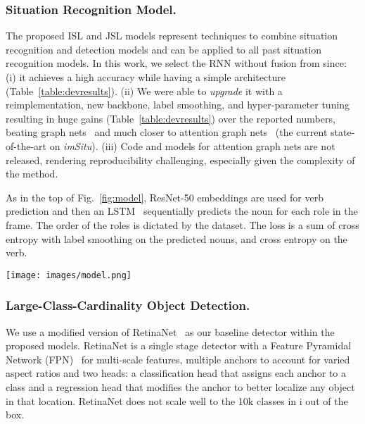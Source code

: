 \documentclass[runningheads]{llncs}
\newcommand{\dataset}{\mbox{\sc{SW}}i\mbox{\sc{G}}\xspace}
\newcommand{\imsitu}{\emph{imSitu}\xspace}
\begin{document}
\subsubsection{Situation Recognition Model. }
The proposed ISL and JSL models represent techniques to combine situation recognition and detection models and can be applied to all past situation recognition models. In this work, we select the RNN without fusion from \cite{imsiturnn} since: (i) it achieves a high accuracy while having a simple architecture (Table~\ref{table:devresults}). (ii) We were able to \emph{upgrade} it with a reimplementation, new backbone, label smoothing, and hyper-parameter tuning resulting in huge gains (Table~\ref{table:devresults}) over the reported numbers, beating graph nets~\cite{li2017situation} and much closer to attention graph nets~\cite{suhail2019mixture} (the current state-of-the-art on \imsitu). (iii) Code and models for attention graph nets are not released, rendering reproducibility challenging, especially given the complexity of the method.

As in the top of Fig.~\ref{fig:model}, ResNet-50 embeddings are used for verb prediction and then an LSTM~\cite{lstm} sequentially predicts the noun for each role in the frame. The order of the roles is dictated by the dataset. The loss is a sum of cross entropy with label smoothing on the predicted nouns, and cross entropy on the verb.

\begin{figure*}[t!]
\begin{center}
\texttt{[image: images/model.png]}
\end{center}
\vspace{-5mm}
\caption{Model schematics for the proposed ISL and JSL models}
\vspace{-5mm}
\label{fig:model}
\end{figure*}

\vspace{-5mm}
\subsubsection{Large-Class-Cardinality Object Detection. }
We use a modified version of RetinaNet~\cite{retinanet} as our baseline detector within the proposed models. RetinaNet is a single stage detector with a Feature Pyramidal Network (FPN)~\cite{fpn} for multi-scale features, multiple anchors to account for varied aspect ratios and two heads: a classification head that assigns each anchor to a class and a regression head that modifies the anchor to better localize any object in that location. RetinaNet does not scale well to the 10k classes in \dataset{} out of the box.
\end{document}
